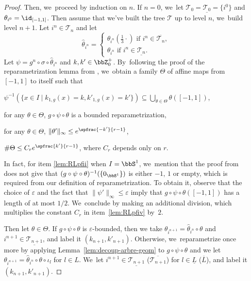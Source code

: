 \begin{proof}
Then, we~proceed by induction on $n$.
If $n=0$, we~let $\mathcal{T}_0 = \underline{\mathcal{T}_0} = \{ i^0 \}$ and $\theta_{i^0} = \id_{[-1, 1]}$.
Then assume that we've built the tree $\mathcal{T}$ up to level $n$, we~build level $n+1$.
Let $i^n \in \mathcal{T}_n$ and let
\[
\hat{\theta}_{i^n} = \begin{cases}
\theta_{i^n} \left (\frac{1}{3} \cdot \right) \text{ if } i^n \in \overline{\mathcal{T}_n},\\
\theta_{i^n} \text{ if } i^n \in \underline{\mathcal{T}_n}.
\end{cases}
\]
Let $\psi = g^n \circ \sigma \circ \hat{\theta}_{i^n}$ and $k,k' \in \bbZ_0^+$. By~following the proof of the reparametrization lemma from \cite{MR4701884}, we~obtain a family $\Theta$ of affine maps from $[-1,1]$ to itself such that
\begin{enumeratei}
\item\label{lem:RLpfi}
$\psi^{-1} \left (\{ x \in I \mid k_{1,g}(x)=k, k'_{1,g}(x)=k'\} \right)\subseteq \bigcup_{\theta\in \Theta} \theta([-1,1])$,
\item\label{lem:RLpfii}
for any $\theta \in \Theta$, $g \circ \psi \circ \theta$ is a bounded reparametrization,
\item\label{lem:RLpfiii}
for any $\theta \in \Theta$, $\| \theta' \|_{\infty}\leq e^{\spfrac{-k'}{r-1}}$,
\item\label{lem:RLpfiv}
$\# \Theta\leq C_r e^{\spfrac{k'}{r-1}}$, where $C_r$ depends only on $r$.
\end{enumeratei}
In fact, for item \eqref{lem:RLpfii} when $I = \bbS^1$, we~mention that the proof from \cite{MR4701884} does not give that $(g \circ \psi \circ \theta)^{-1} (\{ 0_{\bbS^1} \})$ is either $-1$, $1$ or empty, which is required from our definition of reparametrization.
To obtain it, observe that the choice of $\varepsilon$ and the fact that $\| \psi' \|_{\infty} \leq \varepsilon$ imply that $g \circ \psi \circ \theta([-1,1])$ has a length of at most $1/2$. We~conclude by making an additional division, which multiplies the constant $C_r$ in item~\eqref{lem:RLpfiv} by~$2$.

Then let $\theta \in \Theta$. If $g \circ \psi \circ \theta$ is $\varepsilon$-bounded, then we take $\theta_{i^{n+1}} = \hat{\theta}_{i^n} \circ \theta$ and $i^{n+1} \in \underline{\mathcal{T}_{n+1}}$, and label it $(k_{n+1},k'_{n+1})$.
Otherwise, we~reparametrize once more by applying Lemma~\ref{lem:decoup-arbre-geom} to $g \circ \psi \circ \theta$ and we let $\theta_{i^{n+1}} = \hat{\theta}_{i^n} \circ \theta \circ \iota_l$ for $l \in L$. We~let $i^{n+1} \in \underline{\mathcal{T}_{n+1}}$ (\resp $\overline{\mathcal{T}_{n+1}}$) for $l \in \underline{L}$ (\resp $\overline{L}$), and label it $(k_{n+1},k'_{n+1})$.


\end{proof}

